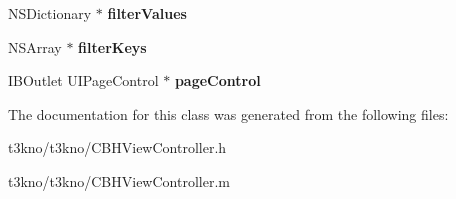 \begin{DoxyCompactItemize}
\item 
\hypertarget{interface_c_b_h_view_controller_a63bd8d08d79e12fdbb5d8433a7ce8d39}{N\-S\-Dictionary $\ast$ {\bfseries filter\-Values}}\label{interface_c_b_h_view_controller_a63bd8d08d79e12fdbb5d8433a7ce8d39}

\item 
\hypertarget{interface_c_b_h_view_controller_a4f3d75d1d8fad73011f6e351b372e3fc}{N\-S\-Array $\ast$ {\bfseries filter\-Keys}}\label{interface_c_b_h_view_controller_a4f3d75d1d8fad73011f6e351b372e3fc}

\item 
\hypertarget{interface_c_b_h_view_controller_aeba8178ac2f9737a351499d3b5ad689d}{I\-B\-Outlet U\-I\-Page\-Control $\ast$ {\bfseries page\-Control}}\label{interface_c_b_h_view_controller_aeba8178ac2f9737a351499d3b5ad689d}

\end{DoxyCompactItemize}


The documentation for this class was generated from the following files\-:\begin{DoxyCompactItemize}
\item 
t3kno/t3kno/C\-B\-H\-View\-Controller.\-h\item 
t3kno/t3kno/C\-B\-H\-View\-Controller.\-m\end{DoxyCompactItemize}
